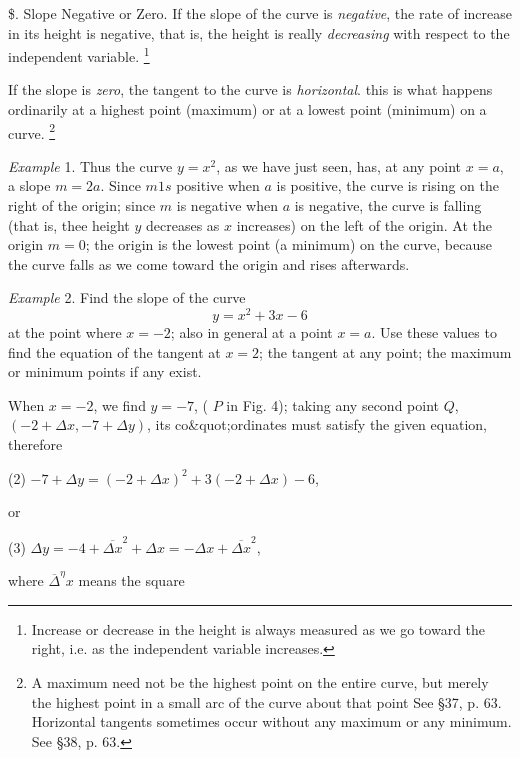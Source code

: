 \documentclass[12pt]{article}
\begin{document}
\$. Slope Negative or Zero. If the slope of the curve is
{\it negative}, the rate of increase in its height is negative, that is,
the height is really {\it decreasing} with respect to the independent
variable. 
\footnote{Increase or decrease in the height is always measured as we go toward
the right, i.e. as the independent variable increases.}

If the slope is {\it zero}, the tangent to the curve is {\it horizontal}.
this is what happens ordinarily at a highest point (maximum)
or at a lowest point (minimum) on a curve.
\footnote{A maximum need not be the highest point on the entire curve, but merely
the highest point in a small arc of the curve about that point See \S 37, p. 63.
Horizontal tangents sometimes occur without any maximum or any minimum.
See \S 38, p. 63.}

{\it Example} 1. Thus the curve $y=x^{2}$, as we have just seen, has, at any
point $x=a$, a slope $m=2a$. Since $m1s$ positive when $a$ is positive, the
curve is rising on the right of the origin; since $m$ is negative when $a$ is
negative, the curve is falling (that is, thee height $y$ decreases as $x$ increases)
on the left of the origin. At the origin $m=0$; the origin is the lowest
point (a minimum) on the curve, because the curve falls as we come toward
the origin and rises afterwards.

{\it Example} 2. Find the slope of the curve
\begin{equation}
y=x^{2}+3x-6
\end{equation}
at the point where $x=-2$; also in general at a point $x=a$. Use these
values to find the equation
of the tangent at $x=2$; the
tangent at any point; the
maximum or minimum
points if any exist.

When $x=-2$, we find $y=-7$, ( $P$ in Fig. 4); taking
any second point $Q$, $(-2+\Delta x, -7+\Delta y)$, its 
co\&quot;{o}rdinates must satisfy the given equation, therefore

(2) $-7+\Delta y=(-2+\Delta x)^{2}+3(-2+\Delta x)-6$,

or

(3) $\Delta y=-4 +\overline{\Delta x}^{2}+ 
\Delta x=-\Delta x+\overline{\Delta x}^{2}$,

where $\overline{\Delta}^{\eta}x$ means the square
\end{document}
